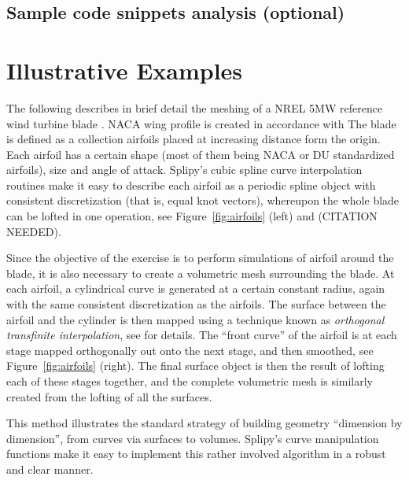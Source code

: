 \documentclass[preprint,12pt, a4paper]{elsarticle}
\begin{document}
\subsection{Sample code snippets analysis (optional)}
\label{}

\section{Illustrative Examples}
\label{sec:naca}

The following describes in brief detail the meshing of a NREL 5MW reference wind turbine blade \cite{Jonkman2009drw}.
NACA wing profile is created in accordance with \cite{abbott1959tow}
The blade is defined as a collection airfoils placed at increasing distance form the origin.
Each airfoil has a certain shape (most of them being NACA or DU standardized airfoils), size and angle of attack.
Splipy's cubic spline curve interpolation routines make it easy to describe each airfoil as a periodic spline object with consistent discretization (that is, equal knot vectors), whereupon the whole blade can be lofted in one operation, see Figure~\ref{fig:airfoils} (left) and (CITATION NEEDED).

Since the objective of the exercise is to perform simulations of airfoil around the blade, it is also necessary to create a volumetric mesh surrounding the blade.
At each airfoil, a cylindrical curve is generated at a certain constant radius, again with the same consistent discretization as the airfoils.
The surface between the airfoil and the cylinder is then mapped using a technique known as \emph{orthogonal transfinite interpolation}, see \cite{Fonn2015sbm} for details.
The ``front curve'' of the airfoil is at each stage mapped orthogonally out onto the next stage, and then smoothed, see Figure~\ref{fig:airfoils} (right).
The final surface object is then the result of lofting each of these stages together, and the complete volumetric mesh is similarly created from the lofting of all the surfaces.

This method illustrates the standard strategy of building geometry ``dimension by dimension'', from curves via surfaces to volumes.
Splipy's curve manipulation functions make it easy to implement this rather involved algorithm in a robust and clear manner.
\end{document}
